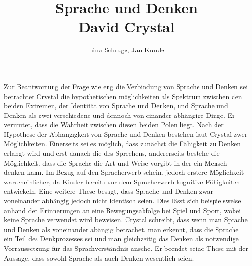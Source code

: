 \documentclass{article}
\title{Sprache und Denken \\ David Crystal}
\author{Lina Schrage, Jan Kunde}
\begin{document}
\maketitle
\noindent
Zur Beantwortung der Frage wie eng die Verbindung von Sprache und Denken sei betrachtet Crystal die hypothetischen möglichkeiten als Spektrum zwischen den beiden Extremen,
der Identität von Sprache und Denken, und Sprache und Denken als zwei verschiedene und dennoch von einander abhängige Dinge. Er vermutet, dass die Wahrheit zwischen diesen beiden Polen liegt. Nach der Hypothese der Abhängigkeit von Sprache und Denken bestehen laut Crystal zwei Möglichkeiten. Einerseits sei es möglich, dass zunächst die Fähigkeit zu Denken erlangt wird und erst danach die des Sprechens, andererseits bestehe die Möglichkeit, dass die Sprache die Art und Weise vorgibt in der ein Mensch denken kann. Im Bezug auf den Spracherwerb scheint jedoch erstere Möglichkeit warscheinlicher, da Kinder bereits vor dem Spracherwerb kognitive Fähigkeiten entwickeln. Eine weitere These besagt, dass Sprache und Denken zwar voneinander abhängig jedoch nicht identisch seien. Dies lässt sich beispielsweise anhand der Erinnerungen an eine Bewegungsabfolge bei Spiel und Sport, wobei keine Sprache verwendet wird beweisen. Crystal schreibt, dass wenn man Sprache und Denken als voneinander abängig betrachet, man erkennt, dass die Sprache ein Teil des Denkprozesses sei und man gleichzeitig das Denken als notwendige Vorraussetzung für das Sprachverständnis ansehe. Er beendet seine These mit der Aussage, dass sowohl Sprache als auch Denken wesentlich seien.
\end{document}

